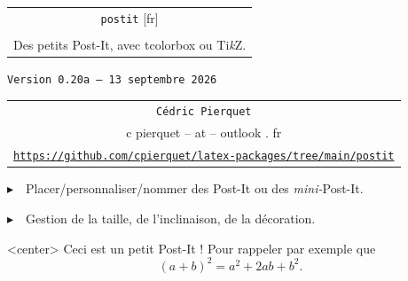 \documentclass[french,a4paper,11pt]{article}
\def\TPversion{0.20a}
\def\TPdate{13 septembre 2026}
\begin{document}
\setlength{\aweboxleftmargin}{0.07\linewidth}
\setlength{\aweboxcontentwidth}{0.93\linewidth}
\setlength{\aweboxvskip}{8pt}

\pagestyle{fancy}

\thispagestyle{empty}

\vspace{2cm}

\begin{center}
	\begin{minipage}{0.75\linewidth}
	\begin{tcolorbox}[colframe=yellow,colback=yellow!15]
		\begin{center}
			\begin{tabular}{c}
				{\Huge \texttt{postit} [fr]}\\
				\\
				{\LARGE Des petits Post-It, avec \textsf{tcolorbox} ou \textsf{Ti\textit{k}Z}.} \\
			\end{tabular}

			\bigskip

			{\small \texttt{Version \TPversion{} -- \TPdate}}
		\end{center}
	\end{tcolorbox}
\end{minipage}
\end{center}

\begin{center}
	\begin{tabular}{c}
	\texttt{Cédric Pierquet}\\
	{\ttfamily c pierquet -- at -- outlook . fr}\\
	\texttt{\url{https://github.com/cpierquet/latex-packages/tree/main/postit}}
\end{tabular}
\end{center}

\vspace{0.25cm}

{$\blacktriangleright$~~Placer/personnaliser/nommer des Post-It ou des \textit{mini-}Post-It.}

\vspace{0.25cm}

{$\blacktriangleright$~~Gestion de la taille, de l'inclinaison, de la décoration.}

\vspace{1cm}

\begin{PostIt}[RappelPostIt=PI1]<center>
	Ceci est un petit Post-It ! Pour rappeler par exemple que \[(a+b)^2=a^2+2ab+b^2.\]
\end{PostIt}
\end{document}
